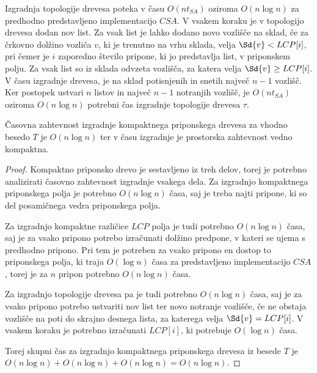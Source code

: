 Izgradnja topologije drevesa poteka v času $O(nt_{SA})$ oziroma $O(n\log{n})$ za predhodno predstavljeno implementacijo $CSA$. V vsakem koraku je v topologijo drevesa dodan nov list. Za vsak list je lahko dodano novo vozlišče na sklad, če za črkovno dolžino vozliča $v$, ki je trenutno na vrhu sklada, velja $\Sd{v}<LCP[i]$, pri čemer je $i$ zaporedno število pripone, ki jo predstavlja list, v priponskem polju. Za vsak list so iz sklada odvzeta vozlišča, za katera velja $\Sd{v}\ge LCP[i]$. V času izgradnje drevesa, je na sklad potisnjenih in snetih največ $n-1$ vozlišč. Ker postopek ustvari $n$ listov in največ $n-1$ notranjih vozlišč, je $O(nt_{SA})$ oziroma $O(n\log{n})$ potrebni čas izgradnje topologije drevesa $\tau$.

\begin{izr} \label{izr:izgradnjaCST}
    Časovna zahtevnost izgradnje kompaktnega priponskega drevesa za vhodno besedo $T$ je $O(n\log{n})$ ter v času izgradnje je prostorska zahtevnost vedno kompaktna.
\end{izr}

\begin{proof}
    Kompaktno priponsko drevo je sestavljeno iz treh delov, torej je potrebno analizirati časovno zahtevnost izgradnje vsakega dela. Za izgradnjo kompaktnega priponskega polja je potrebno $O(n\log{n})$ časa, saj je treba najti pripone, ki so del posamičnega vedra priponskega polja.
    
    Za izgradnjo kompaktne različice $LCP$ polja je tudi potrebno $O(n\log{n})$ časa, saj je za vsako pripono potrebo izračunati dolžino predpone, v kateri se ujema s predhodno pripono. Pri tem je potreben za vsako pripono en dostop to priponskega polja, ki traja $O(\log{n})$ časa za predstavljeno implementacijo $CSA$, torej je za $n$ pripon potrebno $O(n\log{n})$ časa.

    Za izgradnjo topologije drevesa pa je tudi potrebno $O(n\log{n})$ časa, saj je za vsako pripono potrebo ustvariti nov list ter novo notranje vozlišče, če ne obstaja vozlišče na poti do skrajno desnega lista, za katerega velja $\Sd{v}=LCP[i]$. V vsakem koraku je potrebno izračunati $LCP[i]$, ki potrebuje $O(\log{n})$ časa.

    Torej skupni čas za izgradnjo kompaktnega priponskega drevesa iz besede $T$ je $O(n\log{n})+O(n\log{n})+O(n\log{n})=O(n\log{n})$.
\end{proof}

